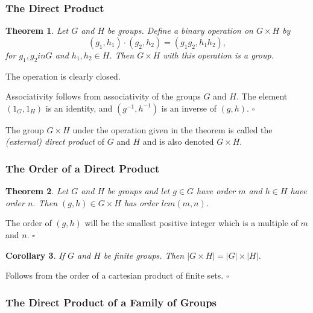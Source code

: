 \documentclass[10pt]{article}
\newtheorem{theorem}{Theorem}[section]
\newtheorem{corollary}[theorem]{Corollary}
\newenvironment{proof}[1][Proof]{\begin{trivlist}
\item[\hskip \labelsep {\itshape #1}]}{\end{trivlist}}
\newenvironment{definition}[1][Definition]{\begin{trivlist}
\item[\hskip \labelsep {\bfseries #1}]}{\end{trivlist}}
\begin{document}
\subsubsection{The Direct Product}

\begin{theorem}
Let $G$ and $H$ be groups. Define a binary operation on $G\times H$ by
$$(g_1, h_1)\cdot (g_2, h_2) = (g_1g_2, h_1h_2),$$
for $g_1, g_2 in G$ and $h_1, h_2 \in H$.
Then $G\times H$ with this operation is a group.
\end{theorem}

\begin{proof}
The operation is clearly closed.

Associativity follows from associativity of the groups $G$ and $H$. The element $(1_G, 1_H)$ is an identity, and $(g^{-1}, h^{-1})$ is an inverse of $(g, h)$. $\square$
\end{proof}

\begin{definition}
The group $G\times H$ under the operation given in the theorem is called the \emph{(external) direct product} of $G$ and $H$ and is also denoted $G\times H$.
\end{definition}

\subsubsection{The Order of a Direct Product}

\begin{theorem}
Let $G$ and $H$ be groups and let $g \in G$ have order $m$ and $h \in H$ have order $n$. Then $(g, h) \in G\times H$ has order $lcm(m, n)$.
\end{theorem}

\begin{proof}
The order of $(g, h)$ will be the smallest positive integer which is a multiple of $m$ and $n$. $\square$
\end{proof}

\begin{corollary}
If $G$ and $H$ be finite groups. Then $|G\times H| = |G|\times |H|$.
\end{corollary}

\begin{proof}
Follows from the order of a cartesian product of finite sets. $\square$
\end{proof}

\subsubsection{The Direct Product of a Family of Groups}
\end{document}
